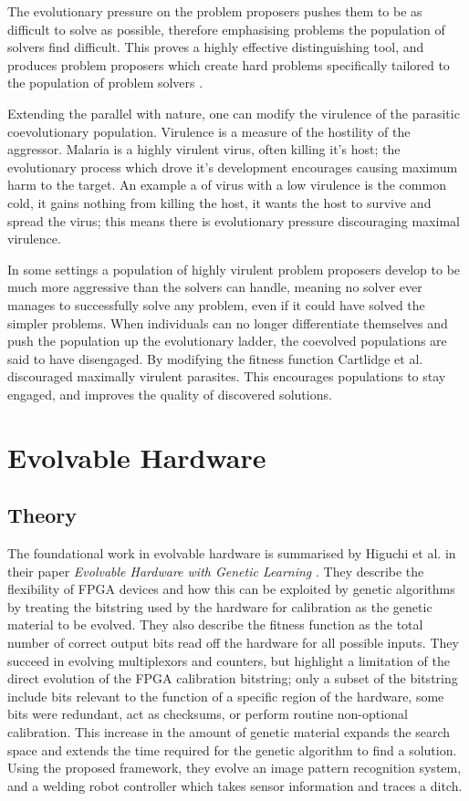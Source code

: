 The evolutionary pressure on the problem proposers pushes them to be as difficult
to solve as possible, therefore emphasising problems the population of solvers
find difficult. This proves a highly effective distinguishing tool, and produces
problem proposers which create hard problems specifically tailored to the population
of problem solvers \cite{HILLIS1990228}.

Extending the parallel with nature, one can modify the virulence of the parasitic
coevolutionary population. Virulence is a measure of the hostility of the aggressor.
Malaria is a highly virulent virus, often killing it's host; the evolutionary
process which drove it's development encourages causing maximum harm to the target.
An example a of virus with a low virulence is the common cold, it gains nothing from
killing the host, it wants the host to survive and spread the virus; this means
there is evolutionary pressure discouraging maximal virulence.

In some settings a population of highly virulent problem proposers develop to be much more
aggressive than the solvers can handle, meaning no solver ever manages to
successfully solve any problem, even if it could have solved the simpler problems.
When individuals can no longer
differentiate themselves and push the population up the evolutionary ladder,
the coevolved populations are said to have disengaged.
By modifying the fitness function Cartlidge et al. \cite{6790490}
discouraged maximally
virulent parasites. This encourages populations to stay engaged, and improves the
quality of discovered solutions.

\section{Evolvable Hardware}

\subsection{Theory}
The foundational work in evolvable hardware is summarised by Higuchi et al. in their
paper {\em Evolvable Hardware with Genetic Learning} \cite{541893}. They describe
the flexibility of FPGA devices and how this can be exploited by genetic algorithms
by treating the bitstring used by the hardware for calibration as the genetic material
to be evolved. They also describe the fitness function as the total number of correct
output bits read off the hardware for all possible inputs. They succeed in evolving multiplexors and
counters, but highlight a limitation of the direct evolution of the FPGA calibration
bitstring; only a subset of the bitstring include bits relevant to the function
of a specific region of the hardware, some bits were redundant, act as checksums, or
perform routine non-optional calibration. This increase in the amount of genetic
material expands the search space and extends the time required for the genetic algorithm to find a solution.
Using the proposed framework, they evolve an image pattern recognition system,
and a welding robot controller which takes sensor information and traces a ditch.

